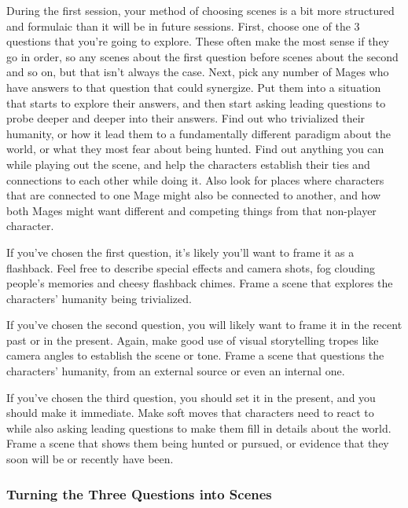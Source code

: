 \documentclass[
  oneside,
  statementpaper,
  9pt]{memoir}
\begin{document}
\begin{MC}

During the first session, your method of choosing scenes is a bit more structured and formulaic than it will be in future sessions. First, choose one of the 3 questions that you’re going to explore. These often make the most sense if they go in order, so any scenes about the first question before scenes about the second and so on, but that isn’t always the case. Next, pick any number of Mages who have answers to that question that could synergize. Put them into a situation that starts to explore their answers, and then start asking leading questions to probe deeper and deeper into their answers. Find out who trivialized their humanity, or how it lead them to a fundamentally different paradigm about the world, or what they most fear about being hunted. Find out anything you can while playing out the scene, and help the characters establish their ties and connections to each other while doing it. Also look for places where characters that are connected to one Mage might also be connected to another, and how both Mages might want different and competing things from that non-player character.

If you’ve chosen the first question, it’s likely you’ll want to frame it as a flashback. Feel free to describe special effects and camera shots, fog clouding people’s memories and cheesy flashback chimes. Frame a scene that explores the characters’ humanity being trivialized.

If you’ve chosen the second question, you will likely want to frame it in the recent past or in the present. Again, make good use of visual storytelling tropes like camera angles to establish the scene or tone. Frame a scene that questions the characters’ humanity, from an external source or even an internal one.

If you’ve chosen the third question, you should set it in the present, and you should make it immediate. Make soft moves that characters need to react to while also asking leading questions to make them fill in details about the world. Frame a scene that shows them being hunted or pursued, or evidence that they soon will be or recently have been.

\end{MC}

\hypertarget{turning-the-three-questions-into-scenes}{%
\subsubsection{Turning the Three Questions into
Scenes}\label{turning-the-three-questions-into-scenes}}
\end{document}
